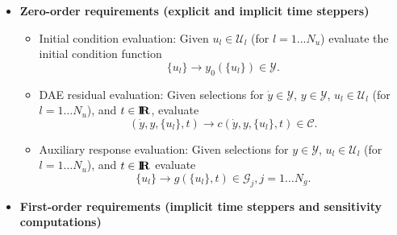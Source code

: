 \documentclass[pdf,ps2pdf,11pt]{SANDreport}
\begin{document}
\begin{itemize}

\item\textbf{Zero-order requirements (explicit and implicit time steppers)}

\begin{itemize}
%
{}\item Initial condition evaluation: Given $u_l\in\mathcal{U}_l$ (for
$l=1\ldots{}N_u$) evaluate the initial condition function
\[
\{u_l\} {}\rightarrow y_0(\{u_l\})\in\mathcal{Y}.
\]
%
{}\item DAE residual evaluation: Given selections for $\dot{y}\in\mathcal{Y}$,
$y\in\mathcal{Y}$, $u_l\in\mathcal{U}_l$ (for $l=1\ldots{}N_u$), and
$t\in\mbox{\textbf{I}}\hspace{-0.6ex}\mbox{\textbf{R}}$, evaluate
\[
(\dot{y},y,\{u_l\},t) {}\rightarrow c(\dot{y},y,\{u_l\},t)\in\mathcal{C}.
\]
%
{}\item Auxiliary response evaluation: Given selections for $y\in\mathcal{Y}$,
$u_l\in\mathcal{U}_l$ (for $l=1\ldots{}N_u$), and $t\in\mbox{\textbf{I}}\hspace{-0.6ex}\mbox{\textbf{R}}$ evaluate
\[
\{u_l\} {}\rightarrow g(\{u_l\},t)\in\mathcal{G}_j, j = 1 \ldots N_g.
\]
%
\end{itemize}

\item\textbf{First-order requirements (implicit time steppers and sensitivity computations)}


\end{itemize}
\end{document}
